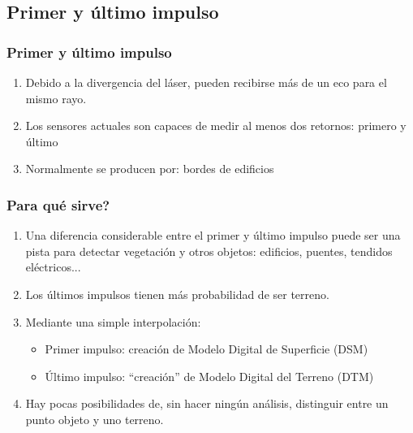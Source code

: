 \subsection{Primer y último impulso}
\begin{frame}[label=firstlast1]
    \frametitle{Primer y último impulso}
    \begin{enumerate}[<+->]
        \item Debido a la divergencia del láser, pueden recibirse \alert<1>{más de un eco} para el mismo rayo.
	\item Los sensores actuales son capaces de medir al menos dos retornos: \alert<2>{primero} y \alert<2>{último}
	\item Normalmente se producen por: \alert<3->{bordes} de edificios \uncover<4->{o \alert<4>{vegetación}}
    \end{enumerate}
    \begin{center}
    \end{center}
\end{frame}
\begin{frame}
    \frametitle{\textquestiondown Para qué sirve?}
    \begin{enumerate}[<+->]
     \item Una diferencia considerable entre el primer y último impulso puede ser una pista para detectar vegetación y otros objetos: edificios, puentes, tendidos eléctricos...
     \item Los últimos impulsos tienen más probabilidad de ser terreno.
     \item Mediante una simple interpolación:
     	\begin{itemize}
     	   \item Primer impulso: creación de Modelo Digital de Superficie (\alert<4>{DSM})
     	   \item \'Ultimo impulso: ``creación'' de Modelo Digital del Terreno (\alert<5>{DTM})
     	\end{itemize}
     \item Hay pocas posibilidades de, sin hacer ningún análisis, distinguir entre un punto \alert<6>{objeto} y uno \alert<6>{terreno}.
    \end{enumerate}
\end{frame}
